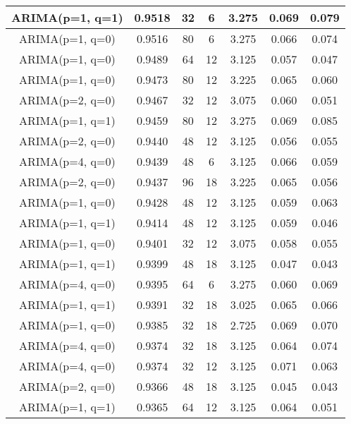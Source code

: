 \begin{table*}[th!]
\begin{tabular}{|c|c|c|c|c|c|c|}
        ARIMA(p=1, q=1) & 0.9518 & 32 & 6 & 3.275 &  0.069 & 0.079 \\
        \hline
        ARIMA(p=1, q=0) & 0.9516 & 80 & 6 & 3.275 &  0.066 & 0.074 \\
        \hline
        ARIMA(p=1, q=0) & 0.9489 & 64 & 12 & 3.125 &  0.057 & 0.047 \\
        \hline
        ARIMA(p=1, q=0) & 0.9473 & 80 & 12 & 3.225 &  0.065 & 0.060 \\
        \hline
        ARIMA(p=2, q=0) & 0.9467 & 32 & 12 & 3.075 &  0.060 & 0.051 \\
        \hline
        ARIMA(p=1, q=1) & 0.9459 & 80 & 12 & 3.275 &  0.069 & 0.085 \\
        \hline
        ARIMA(p=2, q=0) & 0.9440 & 48 & 12 & 3.125 &  0.056 & 0.055 \\
        \hline
        ARIMA(p=4, q=0) & 0.9439 & 48 & 6 & 3.125 &  0.066 & 0.059 \\
        \hline
        ARIMA(p=2, q=0) & 0.9437 & 96 & 18 & 3.225 &  0.065 & 0.056 \\
        \hline
        ARIMA(p=1, q=0) & 0.9428 & 48 & 12 & 3.125 &  0.059 & 0.063 \\
        \hline
        ARIMA(p=1, q=1) & 0.9414 & 48 & 12 & 3.125 &  0.059 & 0.046 \\
        \hline
        ARIMA(p=1, q=0) & 0.9401 & 32 & 12 & 3.075 &  0.058 & 0.055 \\
        \hline
        ARIMA(p=1, q=1) & 0.9399 & 48 & 18 & 3.125 &  0.047 & 0.043 \\
        \hline
        ARIMA(p=4, q=0) & 0.9395 & 64 & 6 & 3.275 &  0.060 & 0.069 \\
        \hline
        ARIMA(p=1, q=1) & 0.9391 & 32 & 18 & 3.025 &  0.065 & 0.066 \\
        \hline
        ARIMA(p=1, q=0) & 0.9385 & 32 & 18 & 2.725 &  0.069 & 0.070 \\
        \hline
        ARIMA(p=4, q=0) & 0.9374 & 32 & 18 & 3.125 &  0.064 & 0.074 \\
        \hline
        ARIMA(p=4, q=0) & 0.9374 & 32 & 12 & 3.125 &  0.071 & 0.063 \\
        \hline
        ARIMA(p=2, q=0) & 0.9366 & 48 & 18 & 3.125 &  0.045 & 0.043 \\
        \hline
        ARIMA(p=1, q=1) & 0.9365 & 64 & 12 & 3.125 &  0.064 & 0.051 \\
        \hline
    \end{tabular}
\end{table*}
